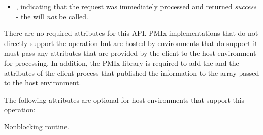 \format


\begin{arglist}
\end{arglist}

\returnsimplenb

\returnstart
\begin{itemize}
    \item {}, indicating that the request was immediately processed and returned \textit{success} - the  will \textit{not} be called.
\end{itemize}
\returnend

\reqattrstart
There are no required attributes for this \ac{API}. \ac{PMIx} implementations that do not directly support the operation but are hosted by environments that do support it must pass any attributes that are provided by the client to the host environment for processing. In addition, the \ac{PMIx} library is required to add the  and the  attributes of the client process that published the information to the  array passed to the host environment.
\reqattrend

\optattrstart
The following attributes are optional for host environments that support this operation:


\optattrend

\descr

Nonblocking  routine.


